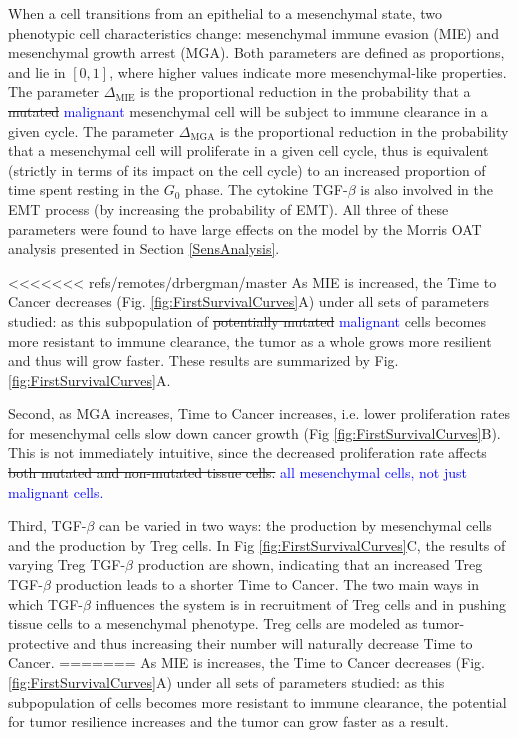 \documentclass[11pt]{article}
\newcommand{\tcb} { \textcolor{blue} }
\begin{document}
When a cell transitions from an epithelial to a mesenchymal state, two phenotypic cell characteristics change: mesenchymal immune evasion (MIE) and mesenchymal growth arrest (MGA).
Both parameters are defined as proportions, and lie in $[0,1]$, where higher values indicate more mesenchymal-like properties.
The parameter $\Delta_\text{MIE}$ is the proportional reduction in the probability that a \sout{mutated} \tcb{malignant} mesenchymal cell will be subject to immune clearance in a given cycle.
The parameter $\Delta_\text{MGA}$ is the proportional reduction in the probability that a mesenchymal cell will proliferate in a given cell cycle, thus is equivalent (strictly in terms of its impact on the cell cycle) to an increased proportion of time spent resting in the $G_0$ phase.
The cytokine TGF-$\beta$ is also involved in the EMT process (by increasing the probability of EMT). All three of these parameters were found to have large effects on the model by the Morris OAT analysis presented in Section \ref{SensAnalysis}.
\par 
<<<<<<< refs/remotes/drbergman/master
As MIE is increased, the Time to Cancer decreases (Fig. \ref{fig:FirstSurvivalCurves}A) under all sets of parameters studied: as this subpopulation of \sout{potentially mutated} \tcb{malignant} cells becomes more resistant to immune clearance, the tumor as a whole grows more resilient and thus will grow faster.
These results are summarized by Fig. \ref{fig:FirstSurvivalCurves}A.
\par
Second, as MGA increases, Time to Cancer increases, i.e. lower proliferation rates for mesenchymal cells slow down cancer growth (Fig \ref{fig:FirstSurvivalCurves}B).
This is not immediately intuitive, since the decreased proliferation rate affects \sout{both mutated and non-mutated tissue cells.} \tcb{all mesenchymal cells, not just malignant cells.}
\par
Third, TGF-$\beta$ can be varied in two ways: the production by mesenchymal cells and the production by Treg cells.
In Fig \ref{fig:FirstSurvivalCurves}C, the results of varying Treg TGF-$\beta$ production are shown, indicating that an increased Treg TGF-$\beta$ production leads to a shorter Time to Cancer.
The two main ways in which TGF-$\beta$ influences the system is in recruitment of Treg cells and in pushing tissue cells to a mesenchymal phenotype.
Treg cells are modeled as tumor-protective and thus increasing their number will naturally decrease Time to Cancer.
=======
As MIE is increases, the Time to Cancer decreases (Fig. \ref{fig:FirstSurvivalCurves}A) under all sets of parameters studied: as this subpopulation of cells becomes more resistant to immune clearance, the potential for tumor resilience increases and the tumor can grow faster as a result.
\end{document}
